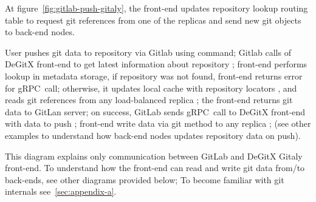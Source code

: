 At figure~\ref{fig:gitlab-push-gitaly}, the front-end updates repository lookup routing table
to request git references from one of the replicas and send new git objects to back-end nodes.

User pushes git data to repository  via Gitlab using  command;
Gitlab calls  of DeGitX front-end to get latest information
about repository ; front-end performs lookup in metadata storage,
if repository was not found, front-end returns error for gRPC~call;
otherwise, it updates local cache with repository locators , and reads git references from
any load-balanced replica ; the front-end returns git data to GitLan server;
on success, GitLab sends  gRPC~call to DeGitX front-end with data to push ;
front-end write data via  git method to any replica ;
(see other examples to understand how back-end nodes updates repository data on push).

This diagram explains only communication between GitLab and DeGitX Gitaly front-end.
To understand how the front-end can read and write git data from/to back-ends, see
other diagrams provided below;
To become familiar with git internals see~\ref{sec:appendix-a}.


